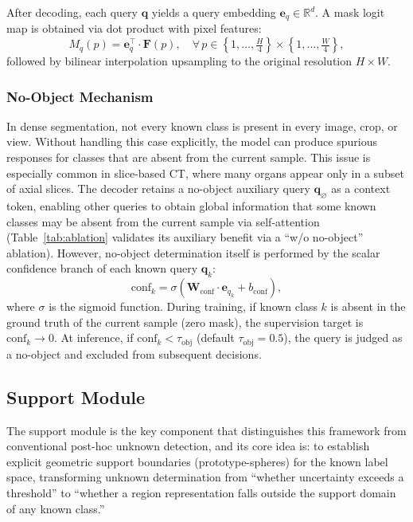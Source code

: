 \documentclass[journal]{IEEEtai}
\newcommand{\R}{\mathbb{R}}
\newcommand{\bF}{\mathbf{F}}
\newcommand{\bq}{\mathbf{q}}
\newcommand{\tobj}{\tau_{\text{obj}}}
\begin{document}
After decoding, each query $\bq$ yields a query embedding $\mathbf{e}_q \in \R^d$.
A mask logit map is obtained via dot product with pixel features:
\begin{equation}\label{eq:mask_logit}
  M_q(p) = \mathbf{e}_q^\top \cdot \bF(p), \quad \forall\, p \in \left\{1, \ldots, \tfrac{H}{4}\right\} \times \left\{1, \ldots, \tfrac{W}{4}\right\},
\end{equation}
followed by bilinear interpolation upsampling to the original resolution $H \times W$.

\subsubsection{No-Object Mechanism}\label{sec:method:parser:noobj}

In dense segmentation, not every known class is present in every image, crop, or view.
Without handling this case explicitly, the model can produce spurious responses for
classes that are absent from the current sample. This issue is especially common in
slice-based CT, where many organs appear only in a subset of axial slices.
The decoder retains a no-object auxiliary query $\bq_{\varnothing}$ as a context token,
enabling other queries to obtain global information that some known classes may be
absent from the current sample via self-attention
(Table~\ref{tab:ablation} validates its auxiliary benefit via a ``w/o no-object''
ablation).
However, no-object determination itself is performed by the scalar confidence branch
of each known query $\bq_k$:
\begin{equation}\label{eq:conf}
  \text{conf}_k = \sigma\!\left(\mathbf{W}_{\text{conf}} \cdot \mathbf{e}_{q_k} + b_{\text{conf}}\right),
\end{equation}
where $\sigma$ is the sigmoid function.
During training, if known class $k$ is absent in the ground truth of the current sample
(zero mask), the supervision target is $\text{conf}_k \to 0$.
At inference, if $\text{conf}_k < \tobj$ (default $\tobj = 0.5$), the query is
judged as a no-object and excluded from subsequent decisions.

\subsection{Support Module}\label{sec:method:support}

The support module is the key component that distinguishes this framework from
conventional post-hoc unknown detection, and its core idea is:
to establish explicit geometric support boundaries (prototype-spheres) for the known
label space, transforming unknown determination from ``whether uncertainty exceeds a
threshold'' to ``whether a region representation falls outside the support domain of
any known class.''
\end{document}
